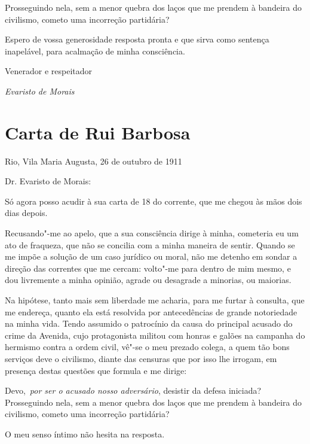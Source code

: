 Prosseguindo nela, sem a menor quebra dos laços que me prendem à
bandeira do civilismo, cometo uma incorreção partidária? 

Espero de vossa generosidade resposta pronta e que sirva como sentença
inapelável, para acalmação de minha consciência. 
\bigskip

\hfill{Venerador e respeitador} 
\bigskip

\hfill{\textit{Evaristo de Morais}}


\section{Carta de Rui Barbosa}
\bigskip

\noindent Rio, Vila Maria Augusta, 26 de outubro de 1911 
\bigskip

\noindent Dr. Evaristo de Morais:
\bigskip

Só agora posso acudir à sua carta de 18 do corrente, que me chegou às
mãos dois dias depois. 

Recusando"-me ao apelo, que a sua consciência
dirige à minha, cometeria eu um ato de fraqueza, que não se concilia
com a minha maneira de sentir. Quando se me impõe a solução de um caso
jurídico ou moral, não me detenho em sondar a direção das correntes
que me cercam: volto"-me para dentro de mim mesmo, e dou livremente a
minha opinião, agrade ou desagrade a minorias, ou maiorias. 

Na hipótese, tanto mais sem liberdade me acharia, para me furtar à
consulta, que me endereça, quanto ela está resolvida por 
antecedências de grande notoriedade na minha vida. Tendo assumido o
patrocínio da causa do principal acusado do crime da Avenida, cujo
protagonista militou com honras e galões na campanha do hermismo contra
a ordem civil, vê"-se o meu prezado colega, a quem tão bons serviços
deve o civilismo, diante das censuras que por isso lhe irrogam, em
presença destas questões que formula e me dirige: 

\begin{hedraquote}
Devo, \textit{por ser
o acusado nosso adversário}, desistir da defesa iniciada? 
Prosseguindo nela, sem a menor quebra dos laços que me prendem à bandeira do
civilismo, cometo uma incorreção partidária? 
\end{hedraquote}

O meu senso íntimo não hesita na resposta. 

